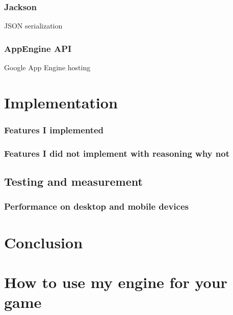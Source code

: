 \documentclass[11pt,oneside, final]{fithesis2}
\begin{document}
\subsection{Jackson}
JSON serialization

\subsection{AppEngine API}
Google App Engine hosting

\chapter{Implementation}
\subsection{Features I implemented}
\subsection{Features I did not implement with reasoning why not}

\section{Testing and measurement}
\subsection{Performance on desktop and mobile devices}

\chapter{Conclusion}


\appendix
\chapter{How to use my engine for your game}
\end{document}
